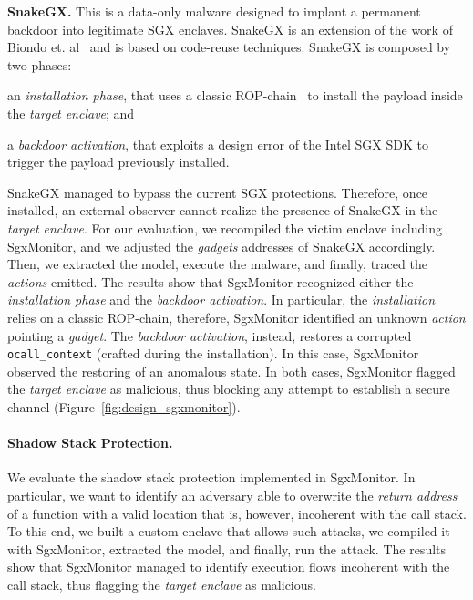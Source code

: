 \textbf{SnakeGX.}
This is a data-only malware designed to implant a permanent backdoor into 
legitimate SGX enclaves. 
\textsf{SnakeGX} is an extension of the work of Biondo et. 
al~\citep{biondo2018guard} and is based on code-reuse techniques.
\textsf{SnakeGX} is composed by two phases: 
\begin{enumerate*}[label=(\roman*)]
	\item an \emph{installation phase}, that uses a classic 
	ROP-chain~\citep{carlini2014rop} to install the payload inside 
	the \emph{target enclave}; and
	\item a \emph{backdoor activation}, that exploits a design error of the 
	Intel SGX SDK to trigger the payload previously installed.
\end{enumerate*}
\textsf{SnakeGX} managed to bypass the current SGX protections. 
Therefore, once installed, an external observer cannot realize the presence of
\textsf{SnakeGX} in the \emph{target enclave}.
For our evaluation, we recompiled the victim enclave including SgxMonitor, 
and we adjusted the \emph{gadgets} addresses of \textsf{SnakeGX} accordingly.
Then, we extracted the model, execute the malware, and finally, traced 
the \emph{actions} emitted.
The results show that SgxMonitor recognized either the 
\emph{installation phase} and the \emph{backdoor activation}.
In particular, the \emph{installation} relies on a classic ROP-chain, 
therefore, SgxMonitor identified an unknown \emph{action} pointing a 
\emph{gadget}.
The \emph{backdoor activation}, instead, restores a corrupted 
\texttt{ocall\_context} (crafted during the installation). In this case, 
SgxMonitor observed the restoring of an anomalous state.
In both cases, SgxMonitor flagged the \emph{target enclave} as 
malicious, thus blocking any attempt to establish a secure channel 
(Figure~\ref{fig:design_sgxmonitor}).


\paragraph{Shadow Stack Protection.}
We evaluate the shadow stack protection implemented in SgxMonitor. In 
particular, we want to identify an adversary able to overwrite the 
\emph{return address} of a function with a valid location that 
is, however, incoherent with the call stack.
To this end, we built a custom enclave that allows such attacks, we compiled it 
with SgxMonitor, extracted the model, and finally, run the attack.
The results show that SgxMonitor managed to identify execution 
flows incoherent with the call stack, thus flagging the \emph{target enclave} 
as malicious.

